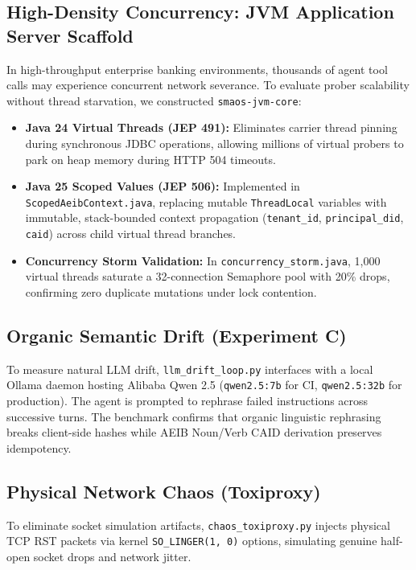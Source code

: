 \documentclass[10pt,journal,compsoc]{IEEEtran}
\begin{document}
\subsection{High-Density Concurrency: JVM Application Server Scaffold}
In high-throughput enterprise banking environments, thousands of agent tool calls may experience concurrent network severance. To evaluate prober scalability without thread starvation, we constructed \texttt{smaos-jvm-core}:
\begin{itemize}
    \item \textbf{Java 24 Virtual Threads (JEP 491):} Eliminates carrier thread pinning during synchronous JDBC operations, allowing millions of virtual probers to park on heap memory during HTTP 504 timeouts.
    \item \textbf{Java 25 Scoped Values (JEP 506):} Implemented in \texttt{ScopedAeibContext.java}, replacing mutable \texttt{ThreadLocal} variables with immutable, stack-bounded context propagation (\texttt{tenant\_id}, \texttt{principal\_did}, \texttt{caid}) across child virtual thread branches.
    \item \textbf{Concurrency Storm Validation:} In \texttt{concurrency\_storm.java}, 1,000 virtual threads saturate a 32-connection Semaphore pool with 20\% drops, confirming zero duplicate mutations under lock contention.
\end{itemize}

\subsection{Organic Semantic Drift (Experiment C)}
To measure natural LLM drift, \texttt{llm\_drift\_loop.py} interfaces with a local Ollama daemon hosting Alibaba Qwen 2.5 (\texttt{qwen2.5:7b} for CI, \texttt{qwen2.5:32b} for production). The agent is prompted to rephrase failed instructions across successive turns. The benchmark confirms that organic linguistic rephrasing breaks client-side hashes while AEIB Noun/Verb CAID derivation preserves idempotency.

\subsection{Physical Network Chaos (Toxiproxy)}
To eliminate socket simulation artifacts, \texttt{chaos\_toxiproxy.py} injects physical TCP RST packets via kernel \texttt{SO\_LINGER(1, 0)} options, simulating genuine half-open socket drops and network jitter.
\end{document}
